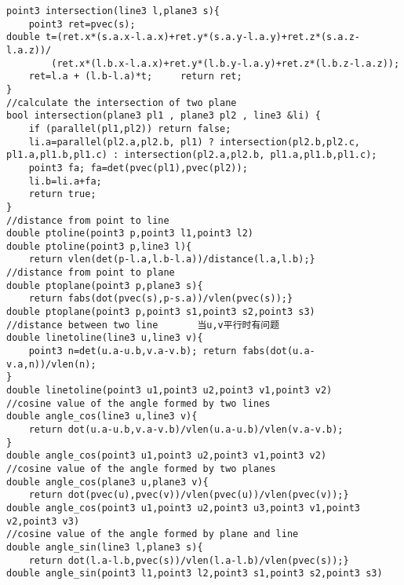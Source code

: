 \begin{lstlisting}
point3 intersection(line3 l,plane3 s){
    point3 ret=pvec(s);
double t=(ret.x*(s.a.x-l.a.x)+ret.y*(s.a.y-l.a.y)+ret.z*(s.a.z-l.a.z))/
        (ret.x*(l.b.x-l.a.x)+ret.y*(l.b.y-l.a.y)+ret.z*(l.b.z-l.a.z));
    ret=l.a + (l.b-l.a)*t;     return ret;
}
//calculate the intersection of two plane 
bool intersection(plane3 pl1 , plane3 pl2 , line3 &li) {
    if (parallel(pl1,pl2)) return false;    
    li.a=parallel(pl2.a,pl2.b, pl1) ? intersection(pl2.b,pl2.c, pl1.a,pl1.b,pl1.c) : intersection(pl2.a,pl2.b, pl1.a,pl1.b,pl1.c);    
    point3 fa; fa=det(pvec(pl1),pvec(pl2));
    li.b=li.a+fa;
    return true;
}
//distance from point to line
double ptoline(point3 p,point3 l1,point3 l2)
double ptoline(point3 p,line3 l){
    return vlen(det(p-l.a,l.b-l.a))/distance(l.a,l.b);}
//distance from point to plane
double ptoplane(point3 p,plane3 s){
    return fabs(dot(pvec(s),p-s.a))/vlen(pvec(s));}
double ptoplane(point3 p,point3 s1,point3 s2,point3 s3)
//distance between two line       当u,v平行时有问题
double linetoline(line3 u,line3 v){
    point3 n=det(u.a-u.b,v.a-v.b); return fabs(dot(u.a-v.a,n))/vlen(n);
}
double linetoline(point3 u1,point3 u2,point3 v1,point3 v2)
//cosine value of the angle formed by two lines
double angle_cos(line3 u,line3 v){
    return dot(u.a-u.b,v.a-v.b)/vlen(u.a-u.b)/vlen(v.a-v.b);
}
double angle_cos(point3 u1,point3 u2,point3 v1,point3 v2)
//cosine value of the angle formed by two planes
double angle_cos(plane3 u,plane3 v){
    return dot(pvec(u),pvec(v))/vlen(pvec(u))/vlen(pvec(v));}
double angle_cos(point3 u1,point3 u2,point3 u3,point3 v1,point3 v2,point3 v3)
//cosine value of the angle formed by plane and line
double angle_sin(line3 l,plane3 s){
    return dot(l.a-l.b,pvec(s))/vlen(l.a-l.b)/vlen(pvec(s));}
double angle_sin(point3 l1,point3 l2,point3 s1,point3 s2,point3 s3)
\end{lstlisting}
